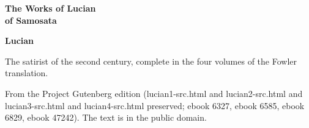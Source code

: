 \documentclass[11pt,letterpaper]{article}
\begin{document}
\color{ink}

\begin{titlepage}
\centering
\vspace*{4em}
{\LARGE\bfseries\color{heading} The Works of Lucian\\[0.3em]of Samosata\par}
\vspace{2em}
{\Large\bfseries\color{heading} Lucian\par}
\vspace{2.5em}
{\itshape\color{subhead}\parbox{0.8\linewidth}{\centering The satirist of the second century, complete in the four volumes of the Fowler translation.\par}}
\vfill
{\small From the Project Gutenberg edition (lucian1-src.html and lucian2-src.html and lucian3-src.html and lucian4-src.html preserved; ebook 6327, ebook 6585, ebook 6829, ebook 47242). The text is in the public domain.\par}
\vspace{2em}
\end{titlepage}

\tableofcontents


\end{document}

